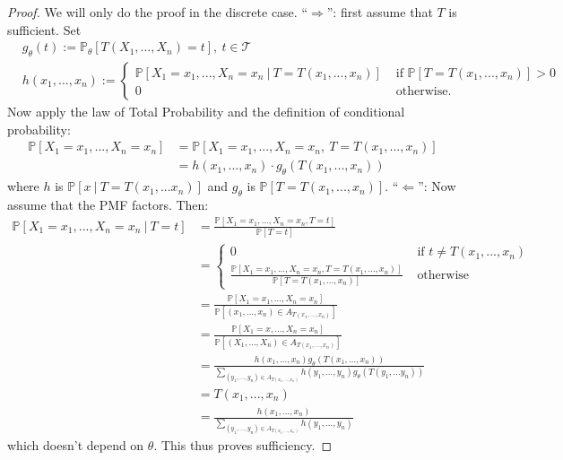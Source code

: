 \documentclass[11pt]{scrartcl}
\theoremstyle{definition}
\theoremstyle{remark}
\newcommand{\pr}[1]{\mathbb{P}\left[#1 \right]}
\newcommand{\prth}[1]{\mathbb{P}_\theta \left[#1 \right]}
\begin{document}
{ \begin{proof}
 	We will only do the proof in the discrete case. ``$\Rightarrow$'': first assume that $T$ is sufficient. Set 
 	\begin{align*}
 		& g_\theta(t) := \prth{T(X_1, ..., X_n) = t},\ t \in \mathcal{T} \\
 		& h(x_1, ..., x_n) := \begin{cases}
 			\pr{X_1 = x_1, ..., X_n = x_n\ |\ T = T(x_1, ..., x_n) } & \text{ if } \pr{T = T(x_1, ..., x_n)} > 0 \\
 			0 & \text{ otherwise.} 
 		\end{cases} 
 	\end{align*}
 	Now apply the law of Total Probability and the definition of conditional probability: 
 	\begin{align*}
 		\pr{X_1 = x_1, ..., X_n = x_n} & = \pr{X_1 = x_1, ..., X_n = x_n,\ T = T(x_1, ..., x_n) } \\ 
 			& = h(x_1, ..., x_n) \cdot g_\theta(T(x_1, ..., x_n)) 
 	\end{align*}
 	where $h$ is $\pr{x\ |\ T = T(x_1,...x_n)}$ and $g_\theta$ is $\pr{T=T(x_1, ..., x_n)}$. 
 	\newline
 	\newline
 	``$\Leftarrow$'': Now assume that the PMF factors. Then: 
 	\begin{align*}
 		\pr{X_1 = x_1, ..., X_n = x_n\ |\ T=t} & = \frac{\pr{X_1 =x_1, ..., X_n = x_n, T=t}}{\pr{T=t}} \\
 		& = \begin{cases}
 			0 & \text{ if } t \neq T(x_1, ..., x_n ) \\
 			\frac{\pr{X_1 = x_1, ..., X_n = x_n, T = T(x_1, ..., x_n)}}{\pr{T=T(x_1, ..., x_n)}} & \text{ otherwise } 
 		\end{cases} \\
 		 & = \frac{\pr{X_1 = x_1, ..., X_n = x_n}}{\pr{(x_1, ..., x_n) \in A_{T(x_1, ..., x_n)}}} \\
 		 & = \frac{\pr{X_1 = x, ..., X_n = x_n}}{\pr{(X_1, ..., X_n) \in A_{T(x_1, ..., x_n)}}} \\
 		 & = \frac{h(x_1, ..., x_n) g_\theta(T(x_1, ..., x_n))}{\sum_{(y_1, ..., y_n) \in A_{T(x_1, ..., x_n)}} h(y_1, ..., y_n) g_\theta (T(y_1, ...y_n))} \\
 		 & = T(x_1, ..., x_n) \\
 		 & = \frac{h(x_1, ..., x_n)}{\sum_{(y_1, ..., y_n) \in A_{T(x_1, ..., x_n)}} h(y_1, ..., y_n)}
 	\end{align*}
 	which doesn't depend on $\theta$. This thus proves sufficiency. 
 \end{proof}
 
}
\end{document}
